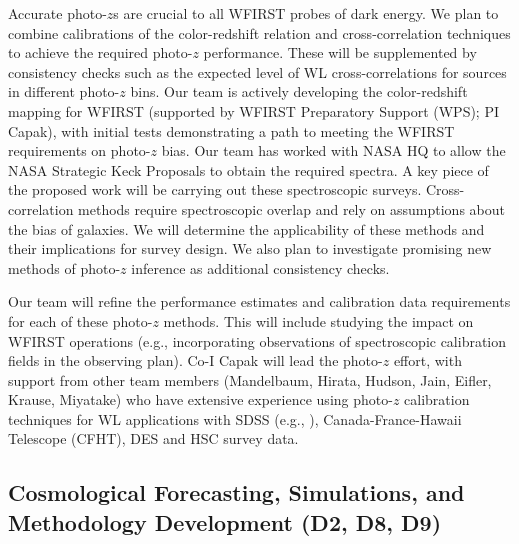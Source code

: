 Accurate photo-$z$s are crucial to all WFIRST probes of
dark energy. We plan to combine calibrations of the color-redshift relation
\cite{Masters2015} and cross-correlation techniques to achieve the
required photo-$z$ performance. These will be supplemented by
consistency checks such as the expected level of WL cross-correlations
for sources in different photo-$z$ bins.
Our team is actively developing the color-redshift mapping for WFIRST
(supported by WFIRST Preparatory Support (WPS); PI Capak),
with initial tests demonstrating a path
to meeting the WFIRST requirements on photo-$z$ bias. Our team has worked with NASA HQ
to allow the NASA Strategic Keck Proposals to obtain the required spectra.
A key piece of the proposed work will be carrying out these spectroscopic surveys.
Cross-correlation methods \cite{2008PhRvD..78d3519H, 2008ApJ...684...88N, Menard2013, Newman2015} require
spectroscopic overlap and rely on assumptions about the bias of galaxies. We
will determine the applicability of these methods and their implications for
survey design. We also plan
to investigate promising new methods of photo-$z$ inference \cite{Bordoloi2010, Jasche2012, Benjamin13}
as additional consistency checks.

Our team will refine the performance estimates and calibration data requirements for each of
these photo-$z$ methods. This will include studying the impact on WFIRST operations
(e.g., incorporating observations of spectroscopic calibration fields in the observing plan).
Co-I Capak will lead the photo-$z$ effort, with support from other team members (Mandelbaum, Hirata,
Hudson, Jain, Eifler, Krause, Miyatake) who have extensive experience
using photo-$z$ calibration techniques for WL applications with SDSS
(e.g., \cite{2012MNRAS.420.3240N,2008MNRAS.386..781M}),
Canada-France-Hawaii Telescope (CFHT), DES and HSC survey data.



\subsection{Cosmological Forecasting, Simulations, and Methodology Development (D2, D8, D9)}
\label{sec:wl_methodology}


